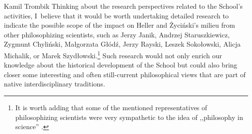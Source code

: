 \begin{artengenv}{Kamil Trombik}
Thinking about the research perspectives related to the School's activities, I~believe that it would be worth undertaking detailed research to indicate the possible scope of the impact on Heller and Życiński's milieu from other philosophizing scientists, such as Jerzy Janik, Andrzej Staruszkiewicz, Zygmunt Chyliński, Małgorzata Głódź, Jerzy Rayski, Leszek Sokołowski, Alicja Michalik, or Marek Szydłowski.\footnote{It is worth adding that some of the mentioned representatives of philosophizing scientists were very sympathetic to the idea of ,,philosophy in science'' 
\parencite[e.g.,][]{glodz_zfwn_1999}.%
} Such research would not only enrich our knowledge about the historical development of the School but could also bring closer some interesting and often still-current philosophical views that are part of native interdisciplinary traditions.



\end{artengenv}

